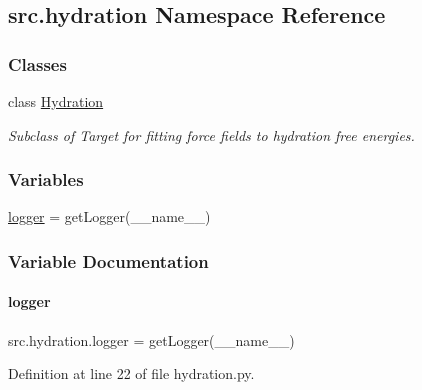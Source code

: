 \hypertarget{namespacesrc_1_1hydration}{}\subsection{src.\+hydration Namespace Reference}
\label{namespacesrc_1_1hydration}
\subsubsection*{Classes}
\begin{DoxyCompactItemize}
\item 
class \hyperlink{classsrc_1_1hydration_1_1Hydration}{Hydration}
\begin{DoxyCompactList}\small\item\em Subclass of Target for fitting force fields to hydration free energies. \end{DoxyCompactList}\end{DoxyCompactItemize}
\subsubsection*{Variables}
\begin{DoxyCompactItemize}
\item 
\hyperlink{namespacesrc_1_1hydration_a87b3d422afd008e2f737fb06b24d32b9}{logger} = get\+Logger(\+\_\+\+\_\+name\+\_\+\+\_\+)
\end{DoxyCompactItemize}


\subsubsection{Variable Documentation}
\mbox{\label{namespacesrc_1_1hydration_a87b3d422afd008e2f737fb06b24d32b9}} 
\paragraph{\texorpdfstring{logger}{logger}}
{\footnotesize\ttfamily src.\+hydration.\+logger = get\+Logger(\+\_\+\+\_\+name\+\_\+\+\_\+)}



Definition at line 22 of file hydration.\+py.

